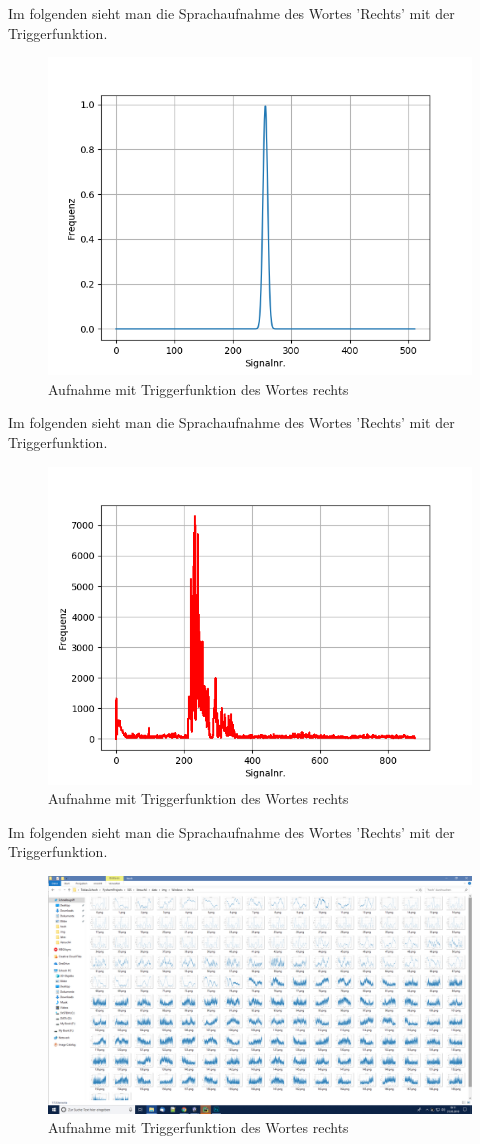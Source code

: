 \documentclass[12pt, oneside, a4paper, \docLanguage]{report}
\begin{document}
\newline
Im folgenden sieht man die Sprachaufnahme des Wortes 'Rechts' mit der Triggerfunktion.
\begin{figure}[H]
	\centering
	\includegraphics[width=.8\linewidth]{../data/img/gauss.png}
	\caption{Aufnahme mit Triggerfunktion des Wortes rechts}
	\label{img:Aufnahme mit Triggerfunktion des Wortes rechts}
\end{figure}
Im folgenden sieht man die Sprachaufnahme des Wortes 'Rechts' mit der Triggerfunktion.
\begin{figure}[H]
	\centering
	\includegraphics[width=.8\linewidth]{../data/img/AlleRichtig.png}
	\caption{Aufnahme mit Triggerfunktion des Wortes rechts}
	\label{img:Aufnahme mit Triggerfunktion des Wortes rechts}
\end{figure}
Im folgenden sieht man die Sprachaufnahme des Wortes 'Rechts' mit der Triggerfunktion.
\begin{figure}[H]
	\centering
	\includegraphics[width=.8\linewidth]{../data/img/window.png}
	\caption{Aufnahme mit Triggerfunktion des Wortes rechts}
	\label{img:Aufnahme mit Triggerfunktion des Wortes rechts}
\end{figure}
\newpage
\end{document}

